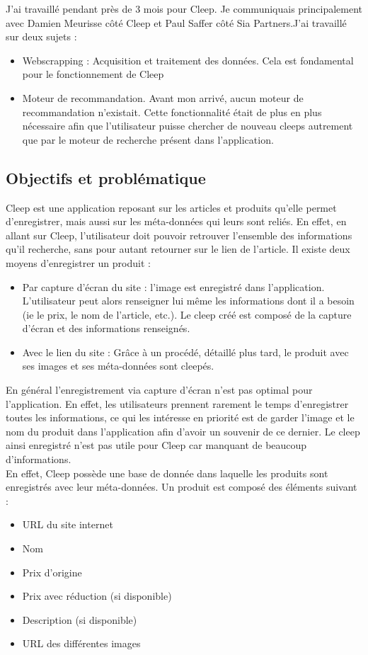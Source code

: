 \documentclass{article} %
\begin{document}
J'ai travaillé pendant près de 3 mois pour Cleep. Je communiquais principalement avec Damien Meurisse côté Cleep et Paul Saffer côté Sia Partners.J'ai travaillé sur deux sujets :
\begin{itemize}
	\item Webscrapping : Acquisition et traitement des données. Cela est fondamental pour le fonctionnement de Cleep
	\item Moteur de recommandation. Avant mon arrivé, aucun moteur de recommandation n'existait. Cette fonctionnalité était de plus en plus nécessaire afin que l'utilisateur puisse chercher de nouveau cleeps autrement que par le moteur de recherche présent dans l'application.
\end{itemize}
\newpage
\subsection{Objectifs et problématique}
Cleep est une application reposant sur les articles et produits qu'elle permet d'enregistrer, mais aussi sur les méta-données qui leurs sont reliés. En effet, en allant sur Cleep, l'utilisateur doit pouvoir retrouver l'ensemble des informations qu'il recherche, sans pour autant retourner sur le lien de l'article. Il existe deux moyens d'enregistrer un produit :
\begin{itemize}
	\item Par capture d'écran du site : l'image est enregistré dans l'application. L'utilisateur peut alors renseigner lui même les informations dont il a besoin (ie le prix, le nom de l'article, etc.). Le cleep créé est composé de la capture d'écran et des informations renseignés.
	\item Avec le lien du site : Grâce à un procédé, détaillé plus tard, le produit avec ses images et ses méta-données sont cleepés.
\end{itemize}
En général l'enregistrement via capture d'écran n'est pas optimal pour l'application. En effet, les utilisateurs prennent rarement le temps d'enregistrer toutes les informations, ce qui les intéresse en priorité est de garder l'image et le nom du produit dans l'application afin d'avoir un souvenir de ce dernier. Le cleep ainsi enregistré n'est pas utile pour Cleep car manquant de beaucoup d'informations.\\
En effet, Cleep possède une base de donnée dans laquelle les produits sont enregistrés avec leur méta-données. Un produit est composé des éléments suivant :
\begin{itemize}
	\itemsep 0em 
	\item URL du site internet
	\item Nom
	\item Prix d'origine
	\item Prix avec réduction (si disponible)
	\item Description (si disponible)
	\item URL des différentes images
\end{itemize}
\end{document}
